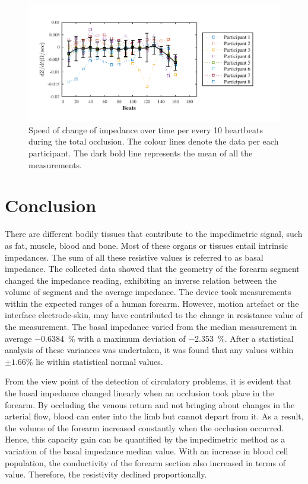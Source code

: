 \begin{figure}[htbp]
	\centering
	\includegraphics[width=15cm,keepaspectratio]{figure_vop_9}    
	\caption[Rate of change of impedance per 10 heartbeats during total occlusion]{Speed of change of impedance over time per every 10 heartbeats during the total occlusion. The colour lines denote the data per each participant. The dark bold line represents the mean of all the measurements.}
	\label{fig:total occlusion change}
\end{figure} 

\section{Conclusion}
\label{section basal conclusion} 

There are different bodily tissues that contribute to the impedimetric signal, such as fat, muscle, blood and bone. Most of these organs or tissues entail intrinsic impedances. The sum of all these resistive values is referred to as basal impedance. The collected data showed that the geometry of the forearm segment changed the impedance reading, exhibiting an inverse relation between the volume of segment and the average impedance. The device took measurements within the expected ranges of a human forearm. However, motion artefact or the interface electrode-skin, may have contributed to the change in resistance value of the measurement. The basal impedance varied from the median measurement in average \SI{-0.6384}{\percent} with a maximum deviation of \SI{-2.353}{\percent}. After a statistical analysis of these variances was undertaken, it was found that any values within $\pm 1.66 \%$ lie within statistical normal values. 

From the view point of the detection of circulatory problems, it is evident that the basal impedance changed linearly when an occlusion took place in the forearm. By occluding the venous return and not bringing about changes in the arterial flow, blood can enter into the limb but cannot depart from it. As a result, the volume of the forearm increased constantly when the occlusion occurred. Hence, this capacity gain can be quantified by the impedimetric method as a variation of the basal impedance median value. With an increase in blood cell population, the conductivity of the forearm section also increased in terms of value. Therefore, the resistivity declined proportionally.

